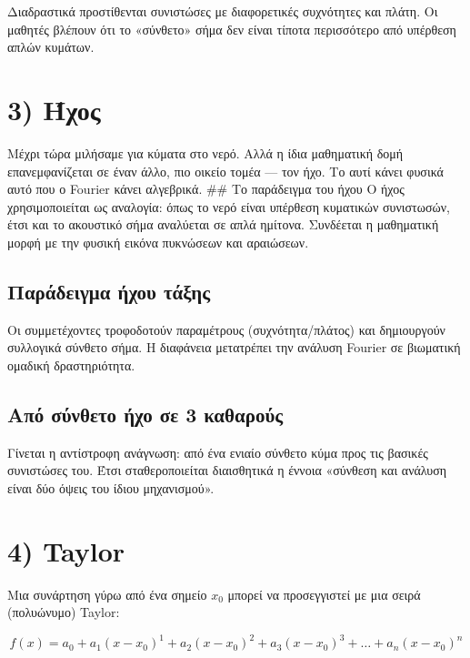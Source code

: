 \documentclass[a4paper, 11pt]{article}
\begin{document}
Διαδραστικά προστίθενται συνιστώσες με διαφορετικές συχνότητες και
πλάτη. Οι μαθητές βλέπουν ότι το «σύνθετο» σήμα δεν είναι τίποτα
περισσότερο από υπέρθεση απλών κυμάτων.

\section{3) Ήχος}\label{ux3aeux3c7ux3bfux3c2}

Μέχρι τώρα μιλήσαμε για κύματα στο νερό. Αλλά η ίδια μαθηματική δομή
επανεμφανίζεται σε έναν άλλο, πιο οικείο τομέα --- τον ήχο. Το αυτί
κάνει φυσικά αυτό που ο Fourier κάνει αλγεβρικά. \#\# Το παράδειγμα του
ήχου Ο ήχος χρησιμοποιείται ως αναλογία: όπως το νερό είναι υπέρθεση
κυματικών συνιστωσών, έτσι και το ακουστικό σήμα αναλύεται σε απλά
ημίτονα. Συνδέεται η μαθηματική μορφή με την φυσική εικόνα πυκνώσεων και
αραιώσεων.

\subsection{Παράδειγμα ήχου
τάξης}\label{ux3c0ux3b1ux3c1ux3acux3b4ux3b5ux3b9ux3b3ux3bcux3b1-ux3aeux3c7ux3bfux3c5-ux3c4ux3acux3beux3b7ux3c2}

Οι συμμετέχοντες τροφοδοτούν παραμέτρους (συχνότητα/πλάτος) και
δημιουργούν συλλογικά σύνθετο σήμα. Η διαφάνεια μετατρέπει την ανάλυση
Fourier σε βιωματική ομαδική δραστηριότητα.

\subsection{Από σύνθετο ήχο σε 3
καθαρούς}\label{ux3b1ux3c0ux3cc-ux3c3ux3cdux3bdux3b8ux3b5ux3c4ux3bf-ux3aeux3c7ux3bf-ux3c3ux3b5-3-ux3baux3b1ux3b8ux3b1ux3c1ux3bfux3cdux3c2}

Γίνεται η αντίστροφη ανάγνωση: από ένα ενιαίο σύνθετο κύμα προς τις
βασικές συνιστώσες του. Έτσι σταθεροποιείται διαισθητικά η έννοια
«σύνθεση και ανάλυση είναι δύο όψεις του ίδιου μηχανισμού».

\section{4) Taylor}\label{taylor}

Μια συνάρτηση γύρω από ένα σημείο \(x_0\) μπορεί να προσεγγιστεί με μια
σειρά (πολυώνυμο) Taylor:

\[
f(x) = a_0 + a_1(x - x_0)^1 + a_2(x - x_0)^2 + a_3(x - x_0)^3 + \dots + a_n(x - x_0)^n
\]
\end{document}
